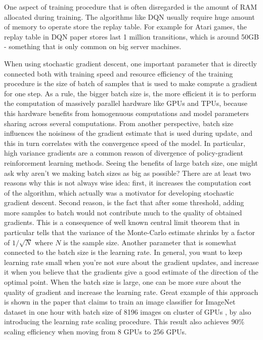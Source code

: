 One aspect of training procedure that is often disregarded is the amount of RAM allocated during
training. The algorithms like DQN usually require huge amount of memory to operate store the
replay table. For example for Atari games, the replay table in DQN \cite{DQN} paper stores
last 1 million transitions, which is around 50GB - something that is only common on big server
machines.

When using stochastic gradient descent, one important parameter that is directly connected both
with training speed and resource efficiency of the training procedure is the size of batch of
samples that is used to make compute a gradient for one step. As a rule, the bigger batch size
is, the more efficient it is to perform the computation of massively parallel hardware like
GPUs and TPUs, because this hardware benefits from homogenuous computations and model parameters
sharing across several computations. From another perspective, batch size influences the noisiness
of the gradient estimate that is used during update, and this in turn correlates with the
convergence speed of the model. In particular, high variance gradients are a common reason of
divergence of policy-gradient reinforcement learning methods. Seeing the benefits of large batch
size, one might ask why aren't we making batch sizes as big as possible? There are at least two
reasons why this is not always wise idea: first, it increases the computation cost of the
algorithm, which actually was a motivator for developing stochastic gradient descent. Second
reason, is the fact that after some threshold, adding more samples to batch would not contribute
much to the quality of obtained gradients. This is a consequence of well known central limit
theorem that in particular tells that the variance of the Monte-Carlo estimate shrinks by a factor
of $1/\sqrt{N}$ where $N$ is the sample size.
Another parameter that is somewhat connected to the batch size is the learning rate. In general,
you want to keep learning rate small when you're not sure about the gradient updates, and increase
it when you believe that the gradients give a good estimate of the direction of the optimal point.
When the batch size is large, one can be more sure about the quality of gradient and increase the
learning rate. Great example of this approach is shown in the paper that claims to train an image
classifier for ImageNet dataset in one hour with batch size of 8196 images on cluster of GPUs
\cite{1hour_imagenet}, by also introducing the learning rate scaling procedure. This result also
achieves 90\% scaling efficiency when moving from 8 GPUs to 256 GPUs.

